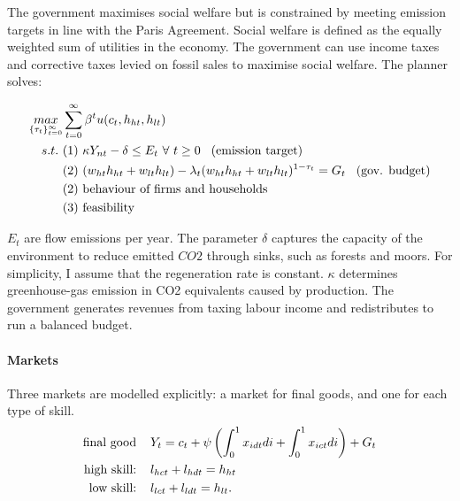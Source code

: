The government maximises social welfare but is constrained by meeting emission targets in line with the Paris Agreement. Social welfare is defined as the equally weighted sum of utilities in the economy. The government can use income taxes and corrective taxes levied on fossil sales to maximise social welfare. The planner solves:

\begin{align*}
\underset{\{\tau_{t}\}_{t=0}^{\infty}}{max}&\sum_{t=0}^{\infty}\beta^t u(c_{t}, h_{ht}, h_{lt})\\
s.t.\ %
& (1)\ \kappa Y_{nt} -\delta \leq E_t \  \forall \ t\geq 0\hspace{3mm} \text{(emission target)}\\
& (2)\ (w_{ht}h_{ht}+w_{lt}h_{lt})-\lambda_t (w_{ht}h_{ht}+w_{lt}h_{lt})^{1-\tau_{t}} = G_t\hspace{3mm} \text{(gov. budget)}\\
& (2)\ \text{behaviour of firms and households}\\
& (3)\ \text{feasibility}
\end{align*}

$E_t$ are flow emissions per year.  The parameter $\delta$ captures the capacity of the environment to reduce emitted $CO2$ through sinks, such as forests and moors.  For simplicity, I assume that the regeneration rate is constant. $\kappa$ determines greenhouse-gas emission in CO2 equivalents caused by production. %
The government generates revenues from taxing labour income and redistributes to run a balanced budget. 


\paragraph{Markets}
Three markets are modelled explicitly: a market for final goods, and one for each type of skill.
\begin{align*}
\text{final good}\hspace{4mm}& Y_{t}=c_t+\psi\left(\int_{0}^1x_{idt}di+\int_{0}^1x_{ict}di\right)+ G_t\\
\text{high skill:}\hspace{4mm}& l_{hct}+l_{hdt}=h_{ht}\\
\text{low skill:}\hspace{4mm}&l_{lct}+l_{ldt}=h_{lt}.
\end{align*}



